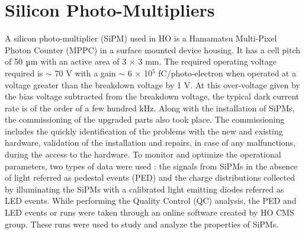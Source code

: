 \section{Silicon Photo-Multipliers}
A silicon photo-multiplier (SiPM) used in HO is a Hamamatsu Multi-Pixel Photon Counter (MPPC) in a surface mounted device housing. It has a cell pitch of 50 $\micro$m with an active area of 3 $\times$ 3 mm. The required operating voltage required is $\sim$ 70 V with a gain $\sim$ 6 $\times$ 10$^5$ fC/photo-electron when operated at a voltage greater than the breakdown voltage by 1 V. At this over-voltage given by the bias voltage subtracted from the breakdown voltage, the typical dark current rate is of the order of a few hundred kHz. Along with the installation of SiPMs, the commissioning of the upgraded parts also took place. The commissioning includes the quickly identification of the problems with the new and existing hardware, validation of the installation and repairs, in case of any malfunctions, during the access to the hardware. To monitor and optimize the operational parameters, two types of data were used : the signals from SiPMs in the absence of light referred as pedestal events (PED) and the charge distributions collected by illuminating the SiPMs with a calibrated light emitting diodes referred as LED events. While performing the Quality Control (QC) analysis, the PED and LED events or runs were taken through an online software created by HO CMS group. These runs were used to study and analyze the properties of SiPMs. 

